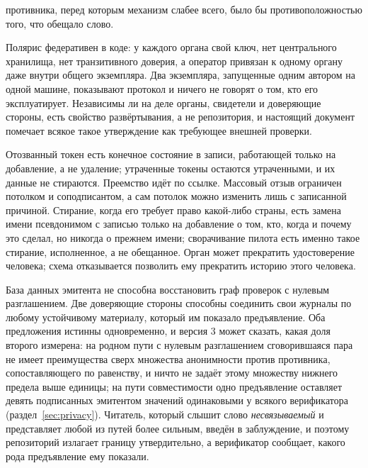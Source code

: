 \begin{description}
    противника, перед которым механизм слабее всего, было бы противоположностью того, что обещало
    слово.
  \item[Техническая федерация не есть общественная децентрализация.] Полярис федеративен в коде:
    у каждого органа свой ключ, нет центрального хранилища, нет транзитивного доверия, а
    оператор привязан к одному органу даже внутри общего экземпляра. Два экземпляра,
    запущенные одним автором на одной машине, показывают протокол и ничего не говорят о том, кто
    его эксплуатирует. Независимы ли на деле органы, свидетели и доверяющие стороны, есть свойство
    развёртывания, а не репозитория, и настоящий документ помечает всякое такое утверждение как
    требующее внешней проверки.
  \item[Отзыв не должен становиться гражданским стиранием.] Отозванный токен есть конечное
    состояние в записи, работающей только на добавление, а не удаление; утраченные токены остаются
    утраченными, и их данные не стираются. Преемство идёт по ссылке. Массовый отзыв ограничен
    потолком и соподписантом, а сам потолок можно изменить лишь с записанной причиной. Стирание,
    когда его требует право какой-либо страны, есть замена имени псевдонимом с записью только на
    добавление о том, кто, когда и почему это сделал, но никогда о прежнем имени; сворачивание
    пилота есть именно такое стирание, исполненное, а не обещанное. Орган может прекратить
    удостоверение человека; схема отказывается позволить ему прекратить историю этого человека.
  \item[Соотносимость у доверяющих сторон не то же самое, что несвязываемость у эмитента.] База
    данных эмитента не способна восстановить граф проверок с нулевым разглашением. Две доверяющие
    стороны способны соединить свои журналы по любому устойчивому материалу, который им показало
    предъявление. Оба предложения истинны одновременно, и версия 3 может сказать, какая доля второго
    измерена: на родном пути с нулевым разглашением сговорившаяся пара не имеет преимущества сверх
    множества анонимности против противника, сопоставляющего по равенству, и ничто не задаёт этому
    множеству нижнего предела выше единицы; на пути совместимости одно предъявление оставляет девять
    подписанных эмитентом значений одинаковыми у всякого верификатора (раздел~\ref{sec:privacy}).
    Читатель, который слышит слово \emph{несвязываемый} и представляет любой из путей более сильным,
    введён в заблуждение, и поэтому репозиторий излагает границу утвердительно, а верификатор
    сообщает, какого рода предъявление ему показали.

\end{description}
